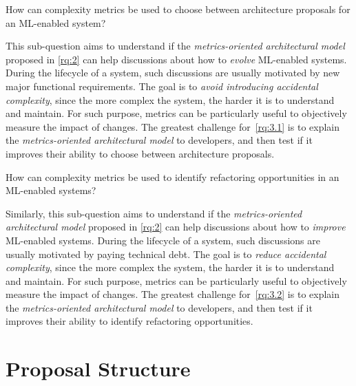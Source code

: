   \begin{subresearchquestion}
    How can complexity metrics be used to choose between architecture
    proposals for an ML-enabled system?
  \end{subresearchquestion}

  This sub-question aims to understand if the \emph{metrics-oriented
  architectural model} proposed in \cref{rq:2} can help discussions
  about how to \emph{evolve} ML-enabled systems. During the lifecycle of a
  system, such discussions are usually motivated by new major functional
  requirements. The goal is to \emph{avoid introducing accidental complexity},
  since the more complex the system, the harder it is to understand
  and maintain. For such purpose, metrics can be particularly useful
  to objectively measure the impact of changes. The greatest challenge
  for~\cref{rq:3.1} is to explain the \emph{metrics-oriented
  architectural model} to developers, and then test if it improves
  their ability to choose between architecture proposals.

  \begin{subresearchquestion}
    How can complexity metrics be used to identify refactoring
    opportunities in an ML-enabled systems?
  \end{subresearchquestion}

  Similarly, this sub-question aims to understand if the
  \emph{metrics-oriented architectural model} proposed in \cref{rq:2}
  can help discussions about how to \emph{improve} ML-enabled systems.
  During the lifecycle of a system, such discussions are usually motivated
  by paying technical debt. The goal is to \emph{reduce accidental complexity},
  since the more complex the system, the harder it is to understand and
  maintain. For such purpose, metrics can be particularly useful to
  objectively measure the impact of changes. The greatest challenge
  for~\cref{rq:3.2} is to explain the \emph{metrics-oriented
  architectural model} to developers, and then test if it improves
  their ability to identify refactoring opportunities.

  \section{Proposal Structure}
  \label{sec:proposal_structure}

